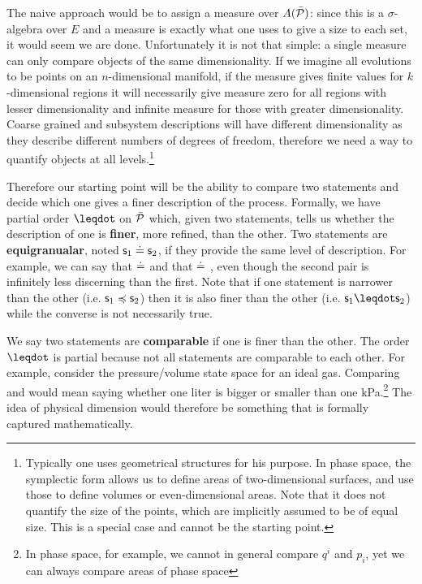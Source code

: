 \documentclass[letterpaper]{article}
\begin{document}
The naive approach would be to assign a measure over $A(\tdomain[P])$: since this is a $\sigma$-algebra over $E$ and a measure is exactly what one uses to give a size to each set, it would seem we are done. Unfortunately it is not that simple: a single measure can only compare objects of the same dimensionality. If we imagine all evolutions to be points on an $n$-dimensional manifold, if the measure gives finite values for $k$-dimensional regions it will necessarily give measure zero for all regions with lesser dimensionality and infinite measure for those with greater dimensionality. Coarse grained and subsystem descriptions will have different dimensionality as they describe different numbers of degrees of freedom, therefore we need a way to quantify objects at all levels.\footnote{Typically one uses geometrical structures for his purpose. In phase space, the symplectic form allows us to define areas of two-dimensional surfaces, and use those to define volumes or even-dimensional areas. Note that it does not quantify the size of the points, which are implicitly assumed to be of equal size. This is a special case and cannot be the starting point.}

Therefore our starting point will be the ability to compare two statements and decide which one gives a finer description of the process. Formally, we have partial order $\finer$ on $\tdomain[P]$ which, given two statements, tells us whether the description of one is \textbf{finer}, more refined, than the other. Two statements are \textbf{equigranualar}, noted $\stmt_1 \eqgran \stmt_2$, if they provide the same level of description. For example, we can say that  $\eqgran$  and that  $\eqgran$ , even though the second pair is infinitely less discerning than the first. Note that if one statement is narrower than the other (i.e. $\stmt_1 \narrower \stmt_2$) then it is also finer than the other (i.e. $\stmt_1 \finer \stmt_2$) while the converse is not necessarily true. 

We say two statements are \textbf{comparable} if one is finer than the other. The order $\finer$ is partial because not all statements are comparable to each other. For example, consider the pressure/volume state space for an ideal gas. Comparing  and  would mean saying whether one liter is bigger or smaller than one kPa.\footnote{In phase space, for example, we cannot in general compare $q^i$ and $p_i$, yet we can always compare areas of phase space} The idea of physical dimension would therefore be something that is formally captured mathematically.
\end{document}
